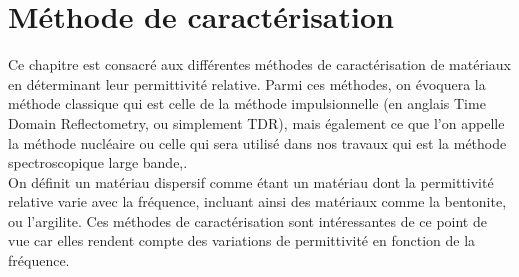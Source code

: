 \chapter{Méthode de caractérisation}
Ce chapitre est consacré aux différentes méthodes de caractérisation de matériaux en déterminant leur permittivité relative. Parmi ces méthodes, on évoquera la méthode classique qui est celle de la méthode impulsionnelle (en anglais Time Domain Reflectometry, ou simplement TDR)\cite{ref5},\cite{ref7} mais également ce que l'on appelle la méthode nucléaire ou celle qui sera utilisé dans nos travaux qui est la méthode spectroscopique large bande\cite{ref6},\cite{ref10}.\\
On définit un matériau dispersif comme étant un matériau dont la permittivité relative varie avec la fréquence, incluant ainsi des matériaux comme la bentonite\cite{ref8},\cite{ref9} ou l'argilite. Ces méthodes de caractérisation sont intéressantes de ce point de vue car elles rendent compte des variations de permittivité en fonction de la fréquence.\\

